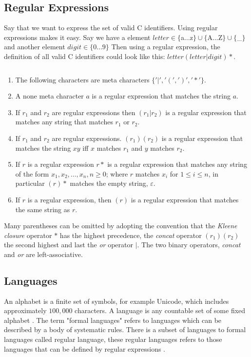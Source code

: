 \subsection{Regular Expressions}
\begin{example}\label{regexpEx}
Say that we want to express the set of valid C identifiers. Using regular 
expressions makes it easy.
Say we have a element $letter \in \{$a$ \dots $z$\} \cup \{$A$ \dots $Z$\} \cup 
\{$\_$\}$
and another element $digit \in \{0 \dots 9\}$
Then using a regular expression, the definition of all valid C identifiers 
could look like this: $letter (letter | digit)*$. 
\end{example}
\begin{definition}\label{regexp} $ $\\
\begin{enumerate}
  \item The following characters are meta characters $\{ '|', '(', ')', '*' \}$.
  \item A none meta character $a$ is a regular expression that matches the 
      string $a$.
  \item If $r_1$ and $r_2$ are regular expressions then $(r_1 | r_2)$ is a 
      regular expression that matches any string that matches $r_1$ or $r_2$.
  \item If $r_1$ and $r_2$ are regular expressions. $(r_1)(r_2)$ is a regular
      expression that matches the string $xy$ iff $x$ matches $r_1$
      and $y$ matches $r_2$.
  \item If $r$ is a regular expression $r*$ is a regular expression that
      matches any string of the form $x_1, x_2, \dots , x_n, n \geq 0$;
      where $r$ matches $x_i$ for $1 \leq i \leq n$, in particular $(r)*$ 
      matches the empty string, $\varepsilon$.
  \item If $r$ is a regular expression, then $(r)$ is a regular expression that
      matches the same string as $r$.
\end{enumerate}
\end{definition}
Many parentheses can be omitted by adopting the convention that the \emph{Kleene
closure} operator $*$ has the highest precedence, the \emph{concat} operator $(r_1)(r_2)$ the second highest and last the \emph{or}
operator $|$. The two binary operators, \emph{concat} and \emph{or} are
left-associative.
\subsection{Languages}
An alphabet is a finite set of symbols, for example Unicode, which 
includes approximately $100,000$ characters. A language is any 
countable set of some fixed alphabet \cite{Aho2006}.
The term "formal languages" refers to languages which can be described by a body 
of systematic rules. There is a subset of languages to formal languages called 
regular language, these regular languages refers to those languages 
that can be defined by regular expressions \cite{Ranta2012}.
